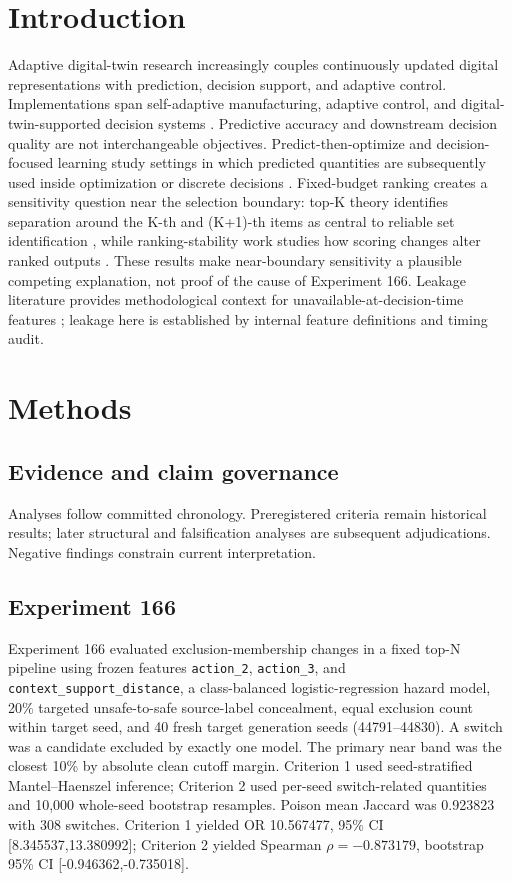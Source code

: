 \documentclass[preprint,12pt]{elsarticle}
\begin{document}
\section{Introduction}
Adaptive digital-twin research increasingly couples continuously updated digital representations with prediction, decision support, and adaptive control. Implementations span self-adaptive manufacturing, adaptive control, and digital-twin-supported decision systems \cite{splettstoesser2023selfadaptive,qiu2025digitaltwins,builesmontano2025digitaltwin}. Predictive accuracy and downstream decision quality are not interchangeable objectives. Predict-then-optimize and decision-focused learning study settings in which predicted quantities are subsequently used inside optimization or discrete decisions \cite{elmachtoub2022smart,elmachtoub2020decisiontrees,mandi2022decisionfocused}. Fixed-budget ranking creates a sensitivity question near the selection boundary: top-K theory identifies separation around the K-th and (K+1)-th items as central to reliable set identification \cite{chen2015spectral}, while ranking-stability work studies how scoring changes alter ranked outputs \cite{asudeh2018stable}. These results make near-boundary sensitivity a plausible competing explanation, not proof of the cause of Experiment 166. Leakage literature provides methodological context for unavailable-at-decision-time features \cite{kapoor2023leakage}; leakage here is established by internal feature definitions and timing audit.
\section{Methods}
\subsection{Evidence and claim governance} Analyses follow committed chronology. Preregistered criteria remain historical results; later structural and falsification analyses are subsequent adjudications. Negative findings constrain current interpretation.
\subsection{Experiment 166} Experiment 166 evaluated exclusion-membership changes in a fixed top-N pipeline using frozen features \texttt{action\_2}, \texttt{action\_3}, and \texttt{context\_support\_distance}, a class-balanced logistic-regression hazard model, 20\% targeted unsafe-to-safe source-label concealment, equal exclusion count within target seed, and 40 fresh target generation seeds (44791--44830). A switch was a candidate excluded by exactly one model. The primary near band was the closest 10\% by absolute clean cutoff margin. Criterion 1 used seed-stratified Mantel--Haenszel inference; Criterion 2 used per-seed switch-related quantities and 10,000 whole-seed bootstrap resamples. Poison mean Jaccard was 0.923823 with 308 switches. Criterion 1 yielded OR 10.567477, 95\% CI [8.345537,13.380992]; Criterion 2 yielded Spearman $\rho=-0.873179$, bootstrap 95\% CI [-0.946362,-0.735018].
\end{document}
